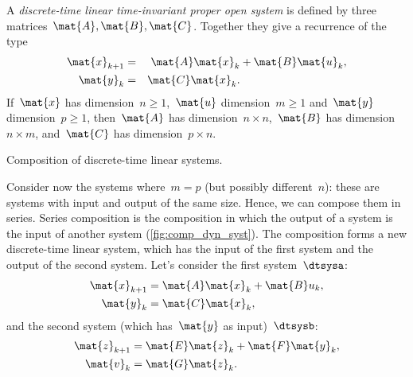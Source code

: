 \begin{definition}
\begin{definition}
	\label{ex:discrete-time-linear}
	\label{def:discrete-time-linear-system}
	A \emph{discrete-time linear time-invariant proper open system} is defined by three matrices~$\mat{A},\mat{B},\mat{C}$.
	Together they give a recurrence of the type
	\begin{equation}
		\label{eq:discrete-time-dynamics}
		\begin{aligned}
			\mat{x}_{k+1} & = & \mat{A} \mat{x}_k  & + \mat{B} \mat{u}_k, \\
			\mat{y}_{k}   & = & \mat{C} \mat{x}_k.
			\\
		\end{aligned}
	\end{equation}
	If~$\mat{x}$ has dimension~$n\geq1$,~$\mat{u}$ dimension~$m\geq1$ and~$\mat{y}$ dimension~$p\geq1$, then~$\mat{A}$ has dimension~$n \times n$,~$\mat{B}$ has dimension~$n \times m$, and~$\mat{C}$ has dimension~$p \times n$.
\end{definition}

\begin{marginfigure}
	\centering
	\caption{Composition of discrete-time linear systems.}
	\label{fig:comp_dyn_syst}
\end{marginfigure}
Consider now the systems where~$m=p$ (but possibly different~$n$):
these are systems with input and output of the same size.
Hence, we can compose them in series.
Series composition is the composition in which the output of a system is the input of another system (\cref{fig:comp_dyn_syst}).
The composition forms a new discrete-time linear system, which has the input of the first system and the output of the second system.
Let's consider the first system~$\dtsysa$:
%
\begin{equation*}
	\label{eq:dlin-1}
	\begin{aligned}
		\mat{x}_{k+1} & = \mat{A} \mat{x}_k + \mat{B} u_k, \\
		\mat{y}_{k}   & = \mat{C} \mat{x}_k,
	\end{aligned}
\end{equation*}
%
and the second system (which has~$\mat{y}$ as input)~$\dtsysb$:
%
\begin{equation*}
	\label{eq:dlin-2}
	\begin{aligned}
		\mat{z}_{k+1} & = \mat{E} \mat{z}_k + \mat{F} \mat{y}_k, \\
		\mat{v}_{k}   & = \mat{G} \mat{z}_k.
	\end{aligned}
\end{equation*}


\end{definition}
